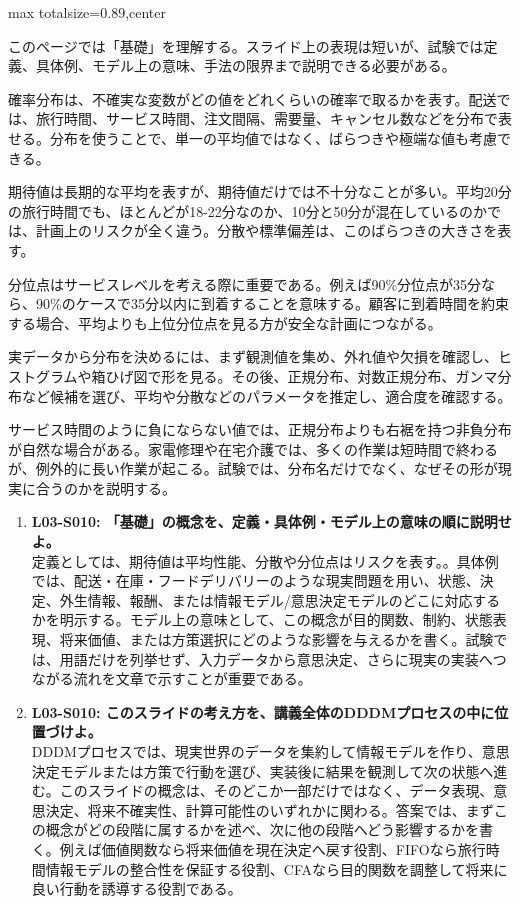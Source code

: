 \begin{minipage}[t]{0.58\textwidth}
\begin{adjustbox}{max totalsize={\textwidth}{0.89\textheight},center}
\begin{minipage}{\textwidth}\scriptsize
{}このページでは「基礎」を理解する。スライド上の表現は短いが、試験では定義、具体例、モデル上の意味、手法の限界まで説明できる必要がある。\par
確率分布は、不確実な変数がどの値をどれくらいの確率で取るかを表す。配送では、旅行時間、サービス時間、注文間隔、需要量、キャンセル数などを分布で表せる。分布を使うことで、単一の平均値ではなく、ばらつきや極端な値も考慮できる。\par
期待値は長期的な平均を表すが、期待値だけでは不十分なことが多い。平均20分の旅行時間でも、ほとんどが18-22分なのか、10分と50分が混在しているのかでは、計画上のリスクが全く違う。分散や標準偏差は、このばらつきの大きさを表す。\par
分位点はサービスレベルを考える際に重要である。例えば90\%分位点が35分なら、90\%のケースで35分以内に到着することを意味する。顧客に到着時間を約束する場合、平均よりも上位分位点を見る方が安全な計画につながる。\par
実データから分布を決めるには、まず観測値を集め、外れ値や欠損を確認し、ヒストグラムや箱ひげ図で形を見る。その後、正規分布、対数正規分布、ガンマ分布など候補を選び、平均や分散などのパラメータを推定し、適合度を確認する。\par
サービス時間のように負にならない値では、正規分布よりも右裾を持つ非負分布が自然な場合がある。家電修理や在宅介護では、多くの作業は短時間で終わるが、例外的に長い作業が起こる。試験では、分布名だけでなく、なぜその形が現実に合うのかを説明する。\par{}\begin{enumerate}\item \textbf{L03-S010: 「基礎」の概念を、定義・具体例・モデル上の意味の順に説明せよ。}\\定義としては、期待値は平均性能、分散や分位点はリスクを表す。。具体例では、配送・在庫・フードデリバリーのような現実問題を用い、状態、決定、外生情報、報酬、または情報モデル/意思決定モデルのどこに対応するかを明示する。モデル上の意味として、この概念が目的関数、制約、状態表現、将来価値、または方策選択にどのような影響を与えるかを書く。試験では、用語だけを列挙せず、入力データから意思決定、さらに現実の実装へつながる流れを文章で示すことが重要である。\item \textbf{L03-S010: このスライドの考え方を、講義全体のDDDMプロセスの中に位置づけよ。}\\DDDMプロセスでは、現実世界のデータを集約して情報モデルを作り、意思決定モデルまたは方策で行動を選び、実装後に結果を観測して次の状態へ進む。このスライドの概念は、そのどこか一部だけではなく、データ表現、意思決定、将来不確実性、計算可能性のいずれかに関わる。答案では、まずこの概念がどの段階に属するかを述べ、次に他の段階へどう影響するかを書く。例えば価値関数なら将来価値を現在決定へ戻す役割、FIFOなら旅行時間情報モデルの整合性を保証する役割、CFAなら目的関数を調整して将来に良い行動を誘導する役割である。\end{enumerate}

\end{minipage}
\end{adjustbox}
\end{minipage}

